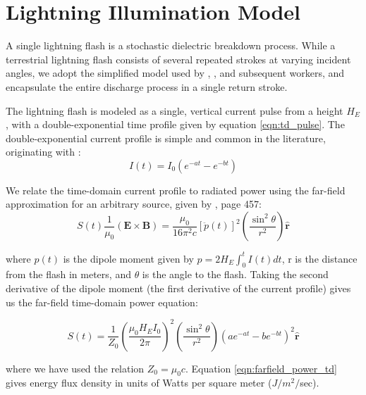 \section{Lightning Illumination Model}
\label{section:input_power}
A single lightning flash is a stochastic dielectric breakdown process. While a terrestrial lightning flash consists of several repeated strokes at varying incident angles, we adopt the simplified model used by \cite{Lauben1998}, \cite{Bortnik2005}, and subsequent workers, and encapsulate the entire discharge process in a single return stroke.

The lightning flash is modeled as a single, vertical current pulse from a height $H_E$, with a double-exponential time profile given by equation \ref{eqn:td_pulse}. The double-exponential current profile is simple and common in the literature, originating with \cite{Bruce_Golde_1941}:
\begin{equation}
\label{eqn:td_pulse}
I(t)=I_0(e^{-a t} - e^{-b t})
\end{equation}

We relate the time-domain current profile to radiated power using the far-field approximation for an arbitrary source, given by \cite{Griffiths1999}, page 457:
\begin{equation}
\label{eqn:griffiths_power}
S(t) 
 \frac{1}{\mu_0}(\mathbf{E} \times \mathbf{B}) = \frac{\mu_0}{16\pi^2c}\left[\ddot{p}(t)\right]^2 \left(\frac{\sin^2\theta}{r^2}\right)\mathbf{\hat{r}}
\end{equation}

where $p(t)$ is the dipole moment given by $p=2 H_E \int_0^t{I(t)}dt$, r is the distance from the flash in meters, and $\theta$ is the angle to the flash. Taking the second derivative of the dipole moment (the first derivative of the current profile) gives us the far-field time-domain power equation:

\begin{equation}
\label{eqn:farfield_power_td}
S(t) = \frac{1}{Z_0}\left(\frac{\mu_0 H_E I_0}{2 \pi}\right)^2\left(\frac{\sin^2\theta}{r^2}\right) \left(a e^{-a t} - b e^{-b t}\right)^2  \mathbf{\hat{r}}
\end{equation}

where we have used the relation $Z_0 = \mu_0 c$. Equation \ref{eqn:farfield_power_td} gives energy flux density in units of Watts per square meter ($J/m^2/$sec).

